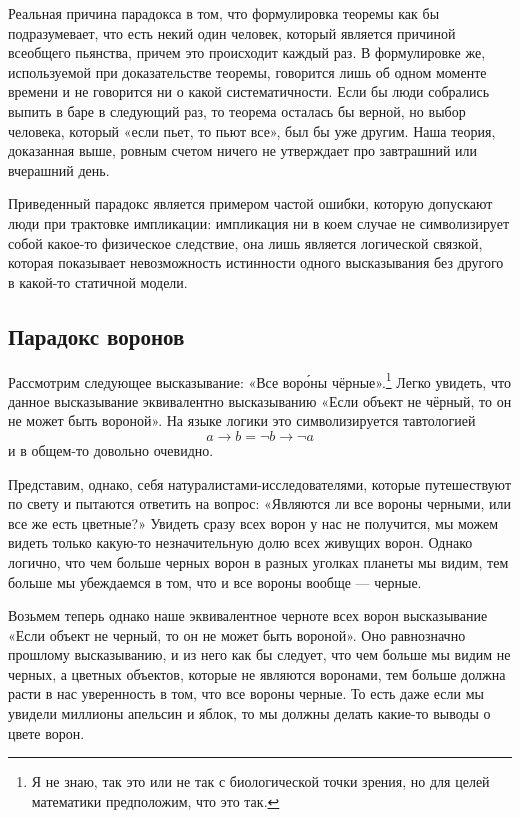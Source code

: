 Реальная причина парадокса в том, что формулировка теоремы как бы подразумевает, что есть некий один человек, который является причиной всеобщего пьянства, причем это происходит каждый раз. В формулировке же, используемой при доказательстве теоремы, говорится лишь об одном моменте времени и не говорится ни о какой систематичности. Если бы люди собрались выпить в баре в следующий раз, то теорема осталась бы верной, но выбор человека, который «если пьет, то пьют все», был бы уже другим. Наша теория, доказанная выше, ровным счетом ничего не утверждает про завтрашний или вчерашний день.

Приведенный парадокс является примером частой ошибки, которую допускают люди при трактовке импликации: импликация ни в коем случае не символизирует собой  какое-то физическое следствие, она лишь является логической связкой, которая показывает невозможность истинности одного высказывания без другого в какой-то статичной модели.

\subsection{Парадокс воронов}

Рассмотрим следующее высказывание: «Все вор\'{о}ны чёрные».\footnote{Я не знаю, так это или не так с биологической точки зрения, но для целей математики предположим, что это так.} Легко увидеть, что данное высказывание эквивалентно высказыванию «Если объект не чёрный, то он не может быть вороной». На языке логики это символизируется тавтологией $$a \rightarrow b = \neg b \rightarrow \neg a$$ и в общем-то довольно очевидно.

Представим, однако, себя натуралистами-исследователями, которые путешествуют по свету и пытаются ответить на вопрос: «Являются ли все вороны черными, или все же есть цветные?» Увидеть сразу всех ворон у нас не получится, мы можем видеть только какую-то незначительную долю всех живущих ворон. Однако логично, что чем больше черных ворон в разных уголках планеты мы видим, тем больше мы убеждаемся в том, что и все вороны вообще — черные.

Возьмем теперь однако наше эквивалентное черноте всех ворон высказывание «Если объект не черный, то он не может быть вороной». Оно равнозначно прошлому высказыванию, и из него как бы следует, что чем больше мы видим не черных, а цветных объектов, которые не являются воронами, тем больше должна расти в нас уверенность в том, что все вороны черные. То есть даже если мы увидели миллионы апельсин и яблок, то мы должны делать какие-то выводы о цвете ворон.

